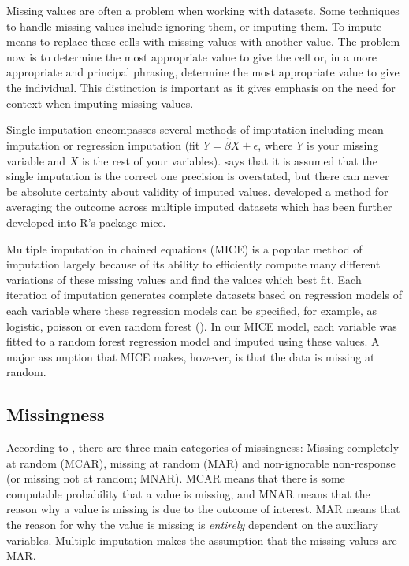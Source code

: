 \documentclass[12pt]{article}
\begin{document}
\label{s.missing}
 
	Missing values are often a problem when working with datasets. Some techniques to handle missing values include ignoring them, or imputing them. To impute means to replace these cells with missing values with another value. The problem now is to determine the most appropriate value to give the cell or, in a more appropriate and principal phrasing, determine the most appropriate value to give the individual. This distinction is important as it gives emphasis on the need for context when imputing missing values.
	
	Single imputation encompasses several methods of imputation including mean imputation or regression imputation (fit $Y= \widehat\beta X + \epsilon$, where $Y$ is your missing variable and $X$ is the rest of your variables). \cite{jadhav1} says that it is assumed that the single imputation is the correct one precision is overstated, but there can never be absolute certainty about validity of imputed values. \cite{rubin1} developed a method for averaging the outcome across multiple imputed datasets which has been further developed into \textsf{R}'s package \textsf{mice}.
	
	Multiple imputation in chained equations (MICE) is a popular method of imputation largely because of its ability to efficiently compute many different variations of these missing values and find the values which best fit. Each iteration of imputation generates complete datasets based on regression models of each variable where these regression models can be specified, for example, as logistic, poisson or even random forest (\cite{mice1}). In our MICE model, each variable was fitted to a random forest regression model and imputed using these values. A major assumption that MICE makes, however, is that the data is missing at random.
	
	\subsection{Missingness}
	
	According to \cite{rarnorld1}, there are three main categories of missingness: Missing completely at random (MCAR), missing at random (MAR) and non-ignorable non-response (or missing not at random; MNAR). MCAR means that there is some computable probability that a value is missing, and MNAR means that the reason why a value is missing is due to the outcome of interest. MAR means that the reason for why the value is missing is \emph{entirely} dependent on the auxiliary variables. Multiple imputation makes the assumption that the missing values are MAR.
	
\end{document}
